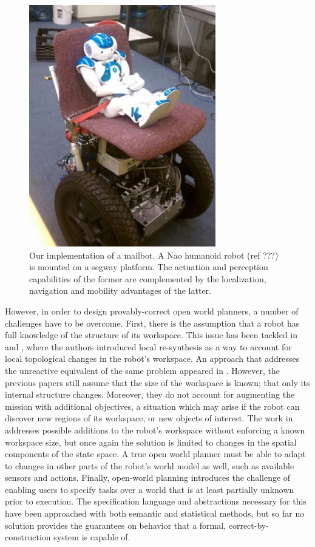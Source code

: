 \begin{figure}[ht]
	\centering
	\includegraphics[width=0.7\columnwidth, clip]{./img/pr3.jpg}
	\caption{Our implementation of a mailbot. A Nao humanoid robot (ref ???) is mounted on a segway platform. The actuation and perception capabilities of the former are complemented by the localization, navigation and mobility advantages of the latter.}
	\label{Fig:pr3}
\end{figure}

However, in order to design provably-correct open world planners, a number of challenges have to be overcome. 
First, there is the assumption that a robot has full knowledge of the structure of its workspace. This issue has been tackled in \cite{MurrayICRA2012} and \cite{MurrayICRA2013a}, where the authors introduced local re-synthesis as a way to account for local topological changes in the robot's workspace. 
An approach that addresses the unreactive equivalent of the same problem appeared in \cite{Dimos2013ICRA}. 
However, the previous papers still assume that the size of the workspace is known; that only its internal structure changes. Moreover, they do not account for augmenting the mission with additional objectives, a situation which may arise if the robot can discover new regions of its workspace, or new objects of interest. 
The work in \cite{BingxinRSS2012} addresses possible additions to the robot's workspace without enforcing a known workspace size, but once again the solution is limited to changes in the spatial components of the state space. 
A true open world planner must be able to adapt to changes in other parts of the robot's world model as well, such as available sensors and actions. 
Finally, open-world planning introduces the challenge of enabling users to specify tasks over a world that is at least partially unknown prior to execution. The specification language and abstractions necessary for this have been approached with both semantic \cite{Joshi2012, MatthiasAI2010} and statistical \cite{Tellex2011} methods, but so far no solution provides the guarantees on behavior that a formal, correct-by-construction system is capable of. 

